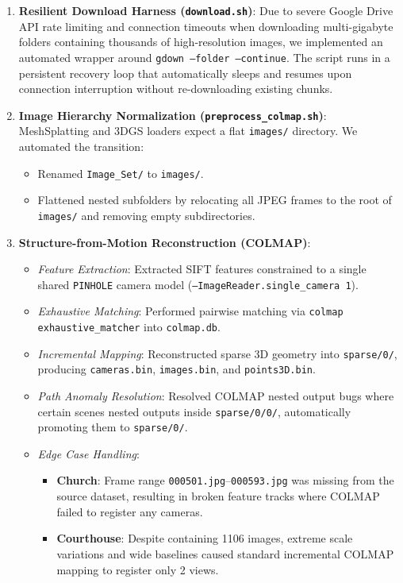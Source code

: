 \begin{enumerate}[leftmargin=*]
    \item \textbf{Resilient Download Harness (\texttt{download.sh})}:
    Due to severe Google Drive API rate limiting and connection timeouts when downloading multi-gigabyte folders containing thousands of high-resolution images, we implemented an automated wrapper around \texttt{gdown --folder --continue}. The script runs in a persistent recovery loop that automatically sleeps and resumes upon connection interruption without re-downloading existing chunks.

    \item \textbf{Image Hierarchy Normalization (\texttt{preprocess\_colmap.sh})}:
    MeshSplatting and 3DGS loaders expect a flat \texttt{images/} directory. We automated the transition:
    \begin{itemize}
        \item Renamed \texttt{Image\_Set/} to \texttt{images/}.
        \item Flattened nested subfolders by relocating all JPEG frames to the root of \texttt{images/} and removing empty subdirectories.
    \end{itemize}

    \item \textbf{Structure-from-Motion Reconstruction (COLMAP)}:
    \begin{itemize}
        \item \textit{Feature Extraction}: Extracted SIFT features constrained to a single shared \texttt{PINHOLE} camera model (\texttt{--ImageReader.single\_camera 1}).
        \item \textit{Exhaustive Matching}: Performed pairwise matching via \texttt{colmap exhaustive\_matcher} into \texttt{colmap.db}.
        \item \textit{Incremental Mapping}: Reconstructed sparse 3D geometry into \texttt{sparse/0/}, producing \texttt{cameras.bin}, \texttt{images.bin}, and \texttt{points3D.bin}.
        \item \textit{Path Anomaly Resolution}: Resolved COLMAP nested output bugs where certain scenes nested outputs inside \texttt{sparse/0/0/}, automatically promoting them to \texttt{sparse/0/}.
        \item \textit{Edge Case Handling}:
        \begin{itemize}
            \item \textbf{Church}: Frame range \texttt{000501.jpg}--\texttt{000593.jpg} was missing from the source dataset, resulting in broken feature tracks where COLMAP failed to register any cameras.
            \item \textbf{Courthouse}: Despite containing 1106 images, extreme scale variations and wide baselines caused standard incremental COLMAP mapping to register only 2 views.
        \end{itemize}
    \end{itemize}


\end{enumerate}
